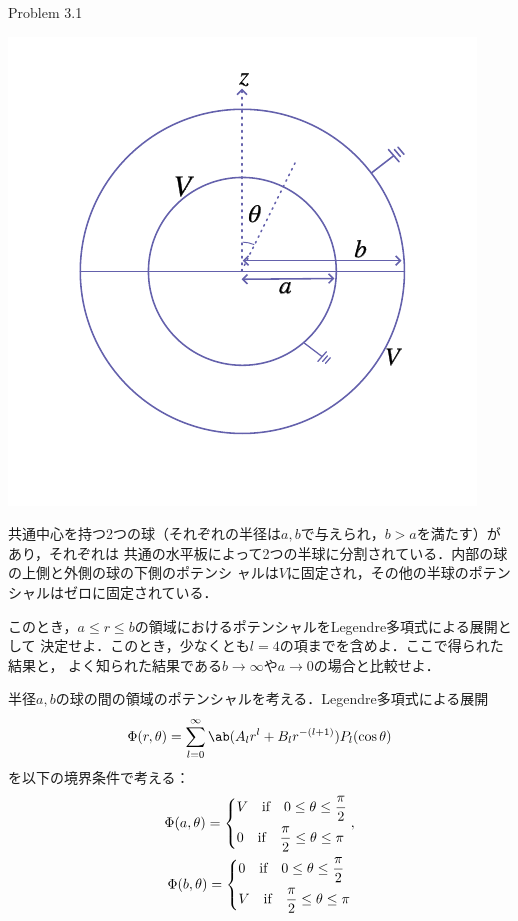 \begin{bx1}{Problem 3.1}
  \begin{wrapstuff}[type=figure,r,lines=7,width=0.23\linewidth]
    \includegraphics[width=\linewidth]{fig/Jackson3-1.pdf}%
  \end{wrapstuff}
  共通中心を持つ2つの球（それぞれの半径は$a, b$で与えられ，$b>a$を満たす）があり，それぞれは
  共通の水平板によって2つの半球に分割されている．内部の球の上側と外側の球の下側のポテンシ
  ャルは$V$に固定され，その他の半球のポテンシャルはゼロに固定されている．

  このとき，$a \leq r \leq b$の領域におけるポテンシャルをLegendre多項式による展開として
  決定せよ．このとき，少なくとも$l = 4$の項までを含めよ．ここで得られた結果と，
  よく知られた結果である$b \to \infty$や$a \to 0$の場合と比較せよ．
\end{bx1}
半径$a, b$の球の間の領域のポテンシャルを考える．Legendre多項式による展開
\begin{gather}%
  \Phi(r, \theta) = \sum_{l=0}^\infty \ab(A_l r^l + B_l r^{-(l+1)}) P_l (\cos\theta)
\end{gather}
を以下の境界条件で考える：
\begin{gather}%
  \label{eq:prob3-1_bc1}
  \Phi(a,\theta) =
  \begin{dcases}%
    V \qqtext{if} 0 \leq \theta \leq \frac{\pi}{2}\\
    0 \qqtext{if} \frac{\pi}{2} \leq \theta \leq \pi
  \end{dcases},\\
  \label{eq:prob3-1_bc2}
  \Phi(b,\theta) =
  \begin{dcases}%
    0 \qqtext{if} 0 \leq \theta \leq \frac{\pi}{2}\\
    V \qqtext{if} \frac{\pi}{2} \leq \theta \leq \pi
  \end{dcases}%
\end{gather}%
